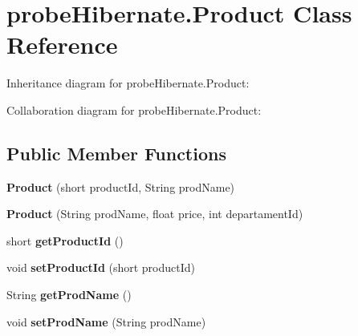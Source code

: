 \hypertarget{classprobe_hibernate_1_1_product}{}\section{probe\+Hibernate.\+Product Class Reference}
\label{classprobe_hibernate_1_1_product}


Inheritance diagram for probe\+Hibernate.\+Product\+:


Collaboration diagram for probe\+Hibernate.\+Product\+:
\subsection*{Public Member Functions}
\begin{DoxyCompactItemize}
\item 
\mbox{\label{classprobe_hibernate_1_1_product_a0a931d7fd3bceff428d4b107afe7f503}} 
{\bfseries Product} (short product\+Id, String prod\+Name)
\item 
\mbox{\label{classprobe_hibernate_1_1_product_ab20ae5d89a781c0d25053fd655fec73f}} 
{\bfseries Product} (String prod\+Name, float price, int departament\+Id)
\item 
\mbox{\label{classprobe_hibernate_1_1_product_a77fcaf019097baa552ccbf81fe501b4a}} 
short {\bfseries get\+Product\+Id} ()
\item 
\mbox{\label{classprobe_hibernate_1_1_product_a3602731aae9e25451a92219cf9a8ab8c}} 
void {\bfseries set\+Product\+Id} (short product\+Id)
\item 
\mbox{\label{classprobe_hibernate_1_1_product_a683392775e144722050dc48728518791}} 
String {\bfseries get\+Prod\+Name} ()
\item 
\mbox{\label{classprobe_hibernate_1_1_product_ab410cfd7b7904d05948ff84f763e04b4}} 
void {\bfseries set\+Prod\+Name} (String prod\+Name)
\item 
\mbox{\label{classprobe_hibernate_1_1_product_ac5b4e0342ed4f97bd4f2a22992742e22}} 

\end{DoxyCompactItemize}
